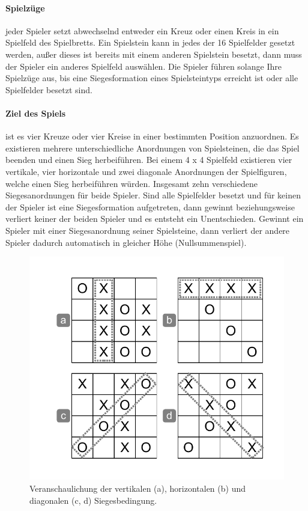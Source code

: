 \paragraph{Spielzüge} jeder Spieler setzt abwechselnd entweder ein Kreuz oder einen Kreis in ein Spielfeld des Spielbretts. Ein Spielstein kann in jedes der 16 Spielfelder gesetzt werden, außer dieses ist bereits mit einem anderen Spielstein besetzt, dann muss der Spieler ein anderes Spielfeld auswählen. Die Spieler führen solange Ihre Spielzüge aus, bis eine Siegesformation eines Spielsteintyps erreicht ist oder alle Spielfelder besetzt sind. 

\paragraph{Ziel des Spiels} ist es vier Kreuze oder vier Kreise in einer bestimmten Position anzuordnen. Es existieren mehrere unterschiedliche Anordnungen von Spielsteinen, die das Spiel beenden und einen Sieg herbeiführen. Bei einem 4 x 4 Spielfeld existieren vier vertikale, vier horizontale und zwei diagonale Anordnungen der Spielfiguren, welche einen Sieg herbeiführen würden. Insgesamt zehn verschiedene Siegesanordnungen für beide Spieler. Sind alle Spielfelder besetzt und für keinen der Spieler ist eine Siegesformation aufgetreten, dann gewinnt beziehungsweise verliert keiner der beiden Spieler und es entsteht ein Unentschieden. Gewinnt ein Spieler mit einer Siegesanordnung seiner Spielsteine, dann verliert der andere Spieler dadurch automatisch in gleicher Höhe (Nullsummenspiel). \\

\begin{figure}[!htbp]
  \centering
  \includegraphics[scale = 0.6]{inhalt/abbildungen/siegesbedingungen_tictactoe.pdf}
  \caption{Veranschaulichung der vertikalen (a), horizontalen (b) und diagonalen (c, d) Siegesbedingung.}
  \label{fig:siegesbedingungen_tictactoe}
\end{figure}

